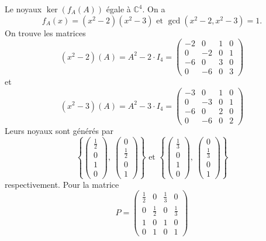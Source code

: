 \begin{example} 
  \label{exe:58}
  Le noyaux $\ker(f_A(A))$ égale à $ℂ^4$. On a
  \begin{displaymath}
    f_A(x) = (x^2-2) (x^2 -3)  \text{  et } \gcd(x^2-2, x^2 -3) = 1. 
  \end{displaymath}
  On trouve les matrices
  \begin{displaymath}
    (x^2-2)(A) = A^2 - 2⋅ I_4 =
    \begin{pmatrix}-2 & 0 & 1 & 0\\0 & -2 & 0 & 1\\-6 & 0 & 3 & 0\\0 & -6 & 0 & 3\end{pmatrix}
  \end{displaymath}
  et
  \begin{displaymath}
    (x^2-3)(A) = A^2 - 3⋅ I_4 =
    \begin{pmatrix}-3 & 0 & 1 & 0\\0 & -3 & 0 & 1\\-6 & 0 & 2 & 0\\0 & -6 & 0 & 2\end{pmatrix}
  \end{displaymath}
  Leurs noyaux sont générés par 
  \begin{displaymath}
    \left\{ \begin{pmatrix}\frac{1}{2}\\0\\1\\0\end{pmatrix}, \  \begin{pmatrix}0\\\frac{1}{2}\\0\\1\end{pmatrix}\right\} \text{ et }
\left\{ \begin{pmatrix}\frac{1}{3}\\0\\1\\0\end{pmatrix}, \  \begin{pmatrix}0\\\frac{1}{3}\\0\\1\end{pmatrix}\right\}
\end{displaymath}
respectivement.
Pour la matrice
\begin{displaymath}
  P = \begin{pmatrix}\frac{1}{2} & 0 & \frac{1}{3} & 0\\0 & \frac{1}{2} & 0 & \frac{1}{3}\\1 & 0 & 1 & 0\\0 & 1 & 0 & 1\end{pmatrix}

\end{displaymath}
\end{example}
